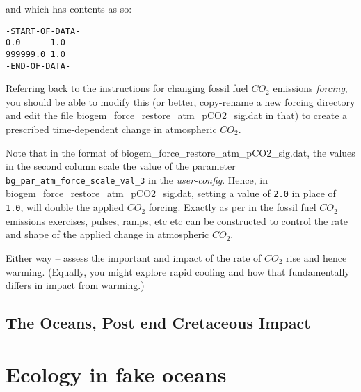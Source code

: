 \documentclass[11pt,fleqn]{book} %
\begin{document}
\begin{enumerate}[noitemsep]
\vspace{8mm}
\pagebreak

and which has contents as so:
\vspace{-1mm}\small\begin{verbatim}
-START-OF-DATA-
0.0      1.0
999999.0 1.0
-END-OF-DATA-
\end{verbatim}\normalsize\vspace{-1mm}

Referring back to the instructions for changing fossil fuel \(CO_{2}\) emissions \textit{forcing}, you should be able to modify this (or better, copy-rename a new forcing directory and edit the file \textsf{\footnotesize biogem\_force\_restore\_atm\_pCO2\_sig.dat} in that) to create a prescribed time-dependent change in atmospheric \(CO_{2}\).

Note that in the format of \textsf{\footnotesize biogem\_force\_restore\_atm\_pCO2\_sig.dat}, the values in the second column scale the value of the parameter \texttt{bg\_par\_atm\_force\_scale\_val\_3} in the \textit{user-config}. Hence, in \textsf{\footnotesize biogem\_force\_restore\_atm\_pCO2\_sig.dat}, setting a value of \texttt{2.0} in place of \texttt{1.0}, will double the applied \(CO_{2}\) forcing. Exactly as per in the fossil fuel \(CO_{2}\) emissions exercises, pulses, ramps, etc etc can be constructed to control the rate and shape of the applied change in atmospheric \(CO_{2}\).

\end{enumerate}

\vspace{2mm}

\noindent Either way --  assess the important and impact of the rate of \(CO_{2}\) rise and hence warming. (Equally, you might explore rapid cooling and how that fundamentally differs in impact from warming.)

\newpage
\subsection*{The Oceans, Post end Cretaceous Impact}




\newpage


\section{Ecology in fake oceans}
\end{document}
